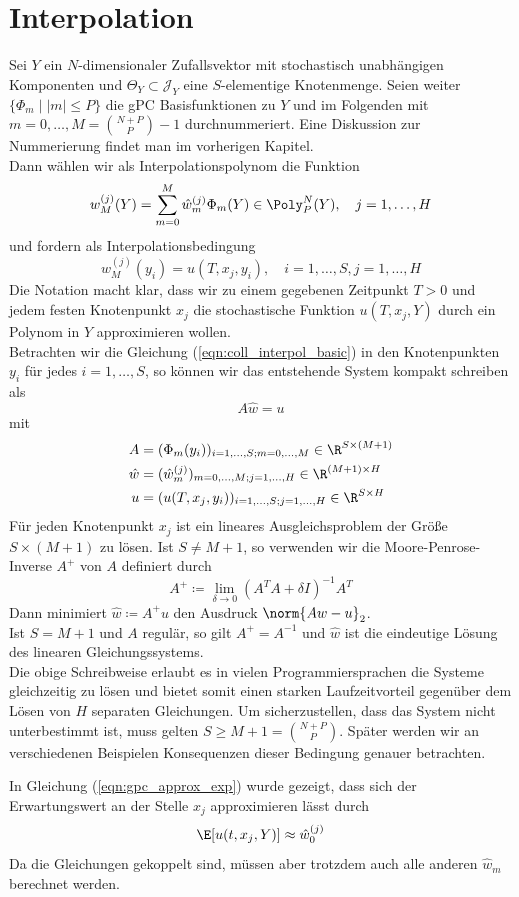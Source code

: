\section{Interpolation}
Sei $Y$ ein $N$-dimensionaler Zufallsvektor mit stochastisch unabhängigen Komponenten und $\Theta_Y\subset \mathcal{J}_Y$ eine $S$-elementige Knotenmenge. Seien weiter $\lbrace \Phi_m \mid |m|\le P \rbrace$ die gPC Basisfunktionen zu $Y$ und im Folgenden mit $m=0,\dots,M=\binom{N+P}{P}-1$ durchnummeriert. Eine Diskussion zur Nummerierung findet man im vorherigen Kapitel.\\
Dann wählen wir als Interpolationspolynom die Funktion
\begin{equation}
\label{eqn:coll_interpol_basic}
w_M^{(j)}(Y)=\sum_{m=0}^M\hat{w}_m^{(j)}\Phi_m(Y)\in\Poly_P^N(Y),\quad j=1,\dots,H
\end{equation}
und fordern als Interpolationsbedingung
\[w_M^{(j)}(y_i)=u(T,x_j,y_i),\quad i=1,\dots,S, j=1,\dots,H\]
Die Notation macht klar, dass wir zu einem gegebenen Zeitpunkt $T>0$ und jedem festen Knotenpunkt $x_j$ die stochastische Funktion $u(T,x_j,Y)$ durch ein Polynom in $Y$ approximieren wollen.\\
Betrachten wir die Gleichung (\ref{eqn:coll_interpol_basic}) in den Knotenpunkten $y_i$ für jedes $i=1,\dots,S$, so können wir das entstehende System kompakt schreiben als
\begin{equation}
\label{eqn:interpol_compact}
A\hat{w}=u
\end{equation}
mit 
\begin{align*}
A&=(\Phi_m(y_i))_{i=1,\dots,S;m=0,\dots,M}\in\R^{S\times (M+1)}\\
\hat{w}&=(\hat{w}_m^{(j)})_{m=0,\dots,M;j=1,\dots,H}\in\R^{(M+1)\times H}\\
u&=(u(T,x_j,y_i))_{i=1,\dots,S;j=1,\dots,H}\in\R^{S\times H}\\
\end{align*}
Für jeden Knotenpunkt $x_j$ ist ein lineares Ausgleichsproblem der Größe $S\times (M+1)$ zu lösen. Ist $S\neq M+1$, so verwenden wir die Moore-Penrose-Inverse $A^+$ von $A$ definiert durch
\[A^+\coloneqq \lim\limits_{\delta\to 0}(A^TA+\delta I)^{-1}A^T\]
Dann minimiert $\hat{w}\coloneqq A^+u$ den Ausdruck $\norm{Aw-u}_2$.\\
Ist $S=M+1$ und $A$ regulär, so gilt $A^+=A^{-1}$ und $\hat{w}$ ist die eindeutige Lösung des linearen Gleichungssystems.\\[0.2cm] 
Die obige Schreibweise erlaubt es in vielen Programmiersprachen die Systeme gleichzeitig zu lösen und bietet somit einen starken Laufzeitvorteil gegenüber dem Lösen von $H$ separaten Gleichungen. Um sicherzustellen, dass das System nicht unterbestimmt ist, muss gelten $S\ge M+1=\binom{N+P}{P}$. Später werden wir an verschiedenen Beispielen Konsequenzen dieser Bedingung genauer betrachten.
\begin{mathbem}
In Gleichung (\ref{eqn:gpc_approx_exp}) wurde gezeigt, dass sich der Erwartungswert an der Stelle $x_j$ approximieren lässt durch
\[\E[u(t,x_j,Y)]\approx \hat{w}_0^{(j)}\]
Da die Gleichungen gekoppelt sind, müssen aber trotzdem auch alle anderen $\hat{w}_m$ berechnet werden.
\end{mathbem}
